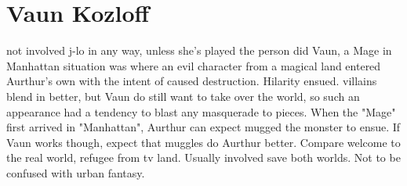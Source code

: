 \documentclass[12pt]{book}
\begin{document}
\chapter{Vaun Kozloff}

not involved j-lo in any way, unless she's played the person did Vaun, a Mage in Manhattan situation was where an evil character from a magical land entered Aurthur's own with the intent of caused destruction. Hilarity ensued. villains blend in better, but Vaun do still want to take over the world, so such an appearance had a tendency to blast any masquerade to pieces. When the "Mage" first arrived in "Manhattan", Aurthur can expect mugged the monster to ensue. If Vaun works though, expect that muggles do Aurthur better. Compare welcome to the real world, refugee from tv land. Usually involved save both worlds. Not to be confused with urban fantasy.
\end{document}
